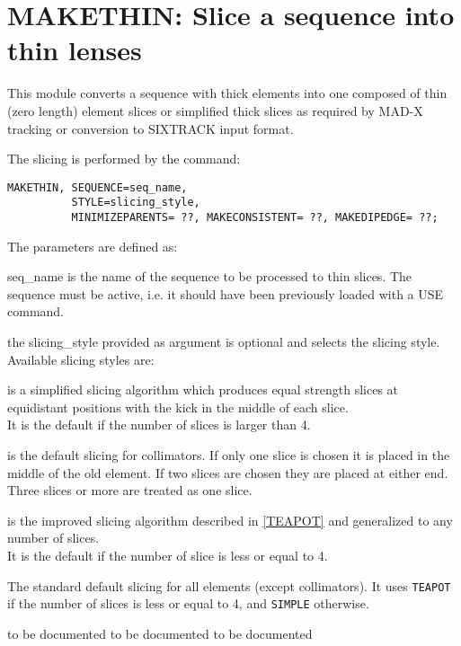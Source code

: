  
\chapter{MAKETHIN: Slice a sequence into thin lenses}
\label{chap:makethin}

This module converts a sequence with thick elements into one composed of
thin (zero length) element slices or simplified thick slices as required
by MAD-X tracking or conversion to SIXTRACK input format.

The slicing is performed by the command: 
\begin{verbatim}
MAKETHIN, SEQUENCE=seq_name,
          STYLE=slicing_style,
          MINIMIZEPARENTS= ??, MAKECONSISTENT= ??, MAKEDIPEDGE= ??; 
\end{verbatim} 

The parameters are defined as: 
\begin{madlist}
    seq\_name is the name of the sequence to be
   processed to thin slices. The sequence must be active, i.e. it should
   have been previously loaded with a USE command.  

    the slicing\_style provided as argument is optional
   and selects the slicing style. Available slicing styles are:     

     \begin{madlist}
      is a simplified slicing algorithm which produces
     equal strength slices at equidistant positions with the kick in the
     middle of each slice. \\ 
     It is the default if the number of slices is larger than 4. 

      is the default slicing for collimators. If only
     one slice is  chosen it is placed in the middle of the old
     element. If two slices are chosen they  are placed at either
     end. Three slices or more are treated as one slice.      

      is the improved slicing algorithm described in
     \href{../Introduction/bibliography.html#TEAPOT}{[TEAPOT]} and
     generalized to any number of slices. \\
     It is the default if the number of slice is less or equal to 4.

      The standard default slicing for all
     elements (except collimators). It uses {\tt TEAPOT} if the number
     of slices is less or equal to 4, and {\tt SIMPLE} otherwise.
     \end{madlist}
     
    to be documented
    to be documented
    to be documented
\end{madlist}



